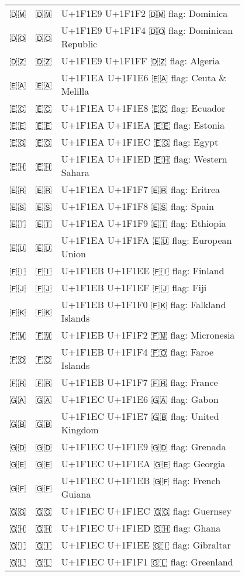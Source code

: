 \documentclass[a4paper,12pt]{article}
\newcommand{\fontA}[1]{{\fontspec[RawFeature={mode=harf,+dist,+ccmp}]{Segoe UI Emoji} #1}}
\newcommand{\fontB}[1]{{\fontspec[RawFeature={mode=harf,+dist,+ccmp}]{Noto Color Emoji} #1}}
\begin{document}
\begin{longtable}[c]{ccp{0.8\linewidth}}
\fontA{🇩🇲}&\fontB{🇩🇲}&U+1F1E9 U+1F1F2 🇩🇲 flag: Dominica\\
\fontA{🇩🇴}&\fontB{🇩🇴}&U+1F1E9 U+1F1F4 🇩🇴 flag: Dominican Republic\\
\fontA{🇩🇿}&\fontB{🇩🇿}&U+1F1E9 U+1F1FF 🇩🇿 flag: Algeria\\
\fontA{🇪🇦}&\fontB{🇪🇦}&U+1F1EA U+1F1E6 🇪🇦 flag: Ceuta \& Melilla\\
\fontA{🇪🇨}&\fontB{🇪🇨}&U+1F1EA U+1F1E8 🇪🇨 flag: Ecuador\\
\fontA{🇪🇪}&\fontB{🇪🇪}&U+1F1EA U+1F1EA 🇪🇪 flag: Estonia\\
\fontA{🇪🇬}&\fontB{🇪🇬}&U+1F1EA U+1F1EC 🇪🇬 flag: Egypt\\
\fontA{🇪🇭}&\fontB{🇪🇭}&U+1F1EA U+1F1ED 🇪🇭 flag: Western Sahara\\
\fontA{🇪🇷}&\fontB{🇪🇷}&U+1F1EA U+1F1F7 🇪🇷 flag: Eritrea\\
\fontA{🇪🇸}&\fontB{🇪🇸}&U+1F1EA U+1F1F8 🇪🇸 flag: Spain\\
\fontA{🇪🇹}&\fontB{🇪🇹}&U+1F1EA U+1F1F9 🇪🇹 flag: Ethiopia\\
\fontA{🇪🇺}&\fontB{🇪🇺}&U+1F1EA U+1F1FA 🇪🇺 flag: European Union\\
\fontA{🇫🇮}&\fontB{🇫🇮}&U+1F1EB U+1F1EE 🇫🇮 flag: Finland\\
\fontA{🇫🇯}&\fontB{🇫🇯}&U+1F1EB U+1F1EF 🇫🇯 flag: Fiji\\
\fontA{🇫🇰}&\fontB{🇫🇰}&U+1F1EB U+1F1F0 🇫🇰 flag: Falkland Islands\\
\fontA{🇫🇲}&\fontB{🇫🇲}&U+1F1EB U+1F1F2 🇫🇲 flag: Micronesia\\
\fontA{🇫🇴}&\fontB{🇫🇴}&U+1F1EB U+1F1F4 🇫🇴 flag: Faroe Islands\\
\fontA{🇫🇷}&\fontB{🇫🇷}&U+1F1EB U+1F1F7 🇫🇷 flag: France\\
\fontA{🇬🇦}&\fontB{🇬🇦}&U+1F1EC U+1F1E6 🇬🇦 flag: Gabon\\
\fontA{🇬🇧}&\fontB{🇬🇧}&U+1F1EC U+1F1E7 🇬🇧 flag: United Kingdom\\
\fontA{🇬🇩}&\fontB{🇬🇩}&U+1F1EC U+1F1E9 🇬🇩 flag: Grenada\\
\fontA{🇬🇪}&\fontB{🇬🇪}&U+1F1EC U+1F1EA 🇬🇪 flag: Georgia\\
\fontA{🇬🇫}&\fontB{🇬🇫}&U+1F1EC U+1F1EB 🇬🇫 flag: French Guiana\\
\fontA{🇬🇬}&\fontB{🇬🇬}&U+1F1EC U+1F1EC 🇬🇬 flag: Guernsey\\
\fontA{🇬🇭}&\fontB{🇬🇭}&U+1F1EC U+1F1ED 🇬🇭 flag: Ghana\\
\fontA{🇬🇮}&\fontB{🇬🇮}&U+1F1EC U+1F1EE 🇬🇮 flag: Gibraltar\\
\fontA{🇬🇱}&\fontB{🇬🇱}&U+1F1EC U+1F1F1 🇬🇱 flag: Greenland\\

\end{longtable}
\end{document}
